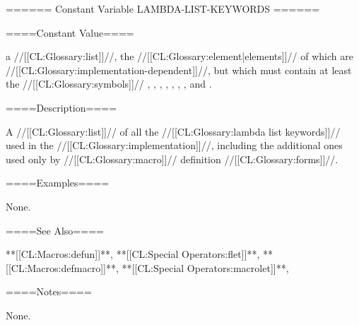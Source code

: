 ====== Constant Variable LAMBDA-LIST-KEYWORDS ======

====Constant Value====

a //[[CL:Glossary:list]]//, the //[[CL:Glossary:element|elements]]// of which are //[[CL:Glossary:implementation-dependent]]//, but which must contain at least the //[[CL:Glossary:symbols]]// , , , , , , , and .

====Description====

A //[[CL:Glossary:list]]// of all the //[[CL:Glossary:lambda list keywords]]// used in the //[[CL:Glossary:implementation]]//, including the additional ones used only by //[[CL:Glossary:macro]]// definition //[[CL:Glossary:forms]]//.

====Examples====

None.

====See Also====

**[[CL:Macros:defun]]**, **[[CL:Special Operators:flet]]**, **[[CL:Macros:defmacro]]**, **[[CL:Special Operators:macrolet]]**, {\secref\EvaluationModel}

====Notes====

None.


